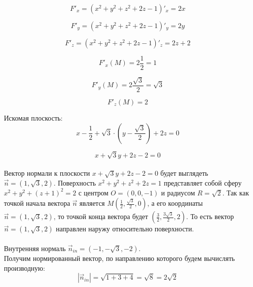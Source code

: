 \documentclass[a5paper, 10pt]{article}
\theoremstyle{definition}
\theoremstyle{plain}
\theoremstyle{remark}
\begin{document}
\begin{equation}
F'_x = \left(  x^2 + y^2 + z^2 + 2z - 1 \right)'_x = 2x
\end{equation}

\begin{equation}
F'_y = \left(  x^2 + y^2 + z^2 + 2z - 1 \right)'_y = 2y
\end{equation}

\begin{equation}
F'_z = \left(  x^2 + y^2 + z^2 + 2z - 1 \right)'_z = 2z + 2
\end{equation}

\begin{equation}
F'_x  \left( M \right) = 2 \frac{1}{2} = 1
\end{equation}

\begin{equation}
F'_y  \left( M \right) = 2 \frac{\sqrt{3}}{2} = \sqrt{3}
\end{equation}

\begin{equation}
F'_z  \left( M \right) = 2
\end{equation}

Искомая плоскость:
\begin{equation}
x - \frac{1}{2}  +  \sqrt{3} \cdot (y - \frac{\sqrt{3}}{2}) + 2z= 0
\end{equation}

\begin{equation}
x  + \sqrt{3}y + 2z - 2= 0
\end{equation}
\\
Вектор нормали к плоскости $x  + \sqrt{3}y + 2z - 2= 0$ будет выглядеть $\vec{n} = \left( 1, \sqrt{3}, 2 \right)$. Поверхность  $x^2 + y^2 + z^2 + 2z = 1$ представляет собой сферу  $x^2 + y^2 + \left( z + 1\right)^2 = 2$ с центром $O = (0, 0, -1)$ и радиусом $R = \sqrt{2}$. Так как точкой начала вектора $\vec{n}$ является  $M \left( \frac{1}{2}, \frac{\sqrt{3}}{2}, 0 \right)$, а его координаты  $\vec{n} = \left( 1, \sqrt{3}, 2 \right)$, то точкой конца вектора будет $\left(  \frac{3}{2}, \frac{3 \sqrt{3}}{2}, 2 \right)$. То есть вектор $\vec{n} = \left( 1, \sqrt{3}, 2 \right)$ направлен наружу относительно поверхности.\\
\\
Внутренняя нормаль $\vec{n}_{in} = \left( -1, -\sqrt{3}, -2 \right)$. \\
Получим нормированный вектор, по направлению которого будем вычислять производную:
\begin{equation}
\left|\vec{n}_{in}  \right| = \sqrt{1 + 3 + 4} =  \sqrt{8} = 2\sqrt{2}
\end{equation}
\end{document}
